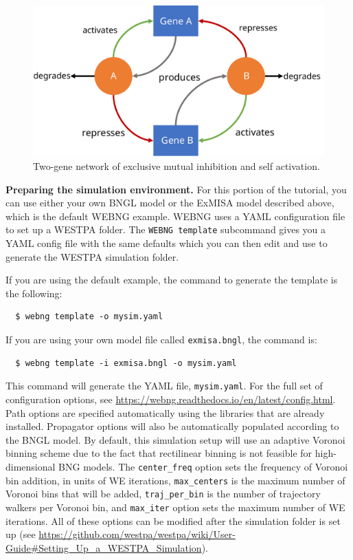 \begin{figure}[t]
\centering
\includegraphics[width=\columnwidth]{figures/Figure13_Network.pdf}
\caption{Two-gene network of exclusive mutual inhibition and self activation.}
\end{figure}

\textbf{Preparing the simulation environment.} For this portion of the tutorial, you can use either your own BNGL model or the ExMISA model described above, which is the default WEBNG example. 
WEBNG uses a YAML configuration file to set up a WESTPA folder. 
The \verb|WEBNG template| subcommand gives you a YAML config file with the same defaults which you can then edit and use to generate the WESTPA simulation folder. 

If you are using the default example, the command to generate the template is the following:
\begin{verbatim}
  $ webng template -o mysim.yaml 
\end{verbatim}

If you are using your own model file called \verb|exmisa.bngl|, the command is:
\begin{verbatim}
  $ webng template -i exmisa.bngl -o mysim.yaml
\end{verbatim}

This command will generate the YAML file, \verb|mysim.yaml|. For the full set of configuration options, see {\url{https://webng.readthedocs.io/en/latest/config.html}}. 
Path options are specified automatically using the libraries that are already installed. 
Propagator options will also be automatically populated according to the BNGL model. 
By default, this simulation setup will use an adaptive Voronoi binning scheme \citep{zhang_exact_2010} due to the fact that rectilinear binning is not feasible for high-dimensional BNG models. 
The \verb|center_freq| option sets the frequency of Voronoi bin addition, in units of WE iterations, \verb|max_centers| is the maximum number of Voronoi bins that will be added, \verb|traj_per_bin| is the number of trajectory walkers per Voronoi bin, and \verb|max_iter| option sets the maximum number of WE iterations. 
All of these options can be modified after the simulation folder is set up (see {\url{https://github.com/westpa/westpa/wiki/User-Guide#Setting_Up_a_WESTPA_Simulation}}). 

